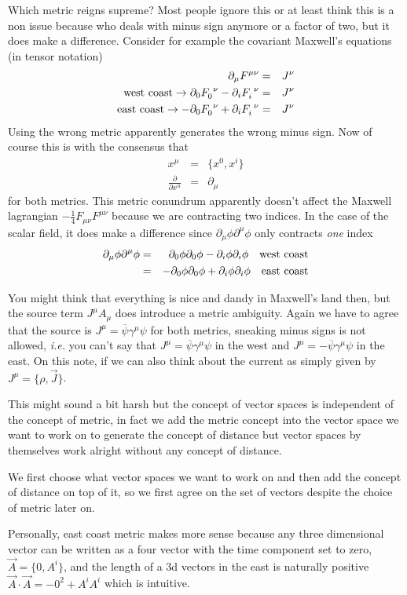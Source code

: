 \documentclass[aps,preprint,preprintnumbers,nofootinbib,showpacs,prd]{revtex4-1}
\newcommand{\ie}{{\it i.e.} }
\newcommand{\nbea}{\begin{eqnarray*}}
\newcommand{\neea}{\end{eqnarray*}}
\begin{document}
Which metric reigns supreme? Most people ignore this or at least think this is a non issue because who deals with minus sign anymore or a factor of two, but it does make a difference. Consider for example the covariant Maxwell's equations (in tensor notation)
%
\nbea
\partial_\mu F^{\mu\nu} & = & J^\nu \\
{\rm west~coast} \to \partial_0 F^{~\nu}_0 - \partial_i F^{~\nu}_i & = & J^\nu \\
{\rm east~coast} \to -\partial_0 F^{~\nu}_0 + \partial_i F^{~\nu}_i & = & J^\nu
\neea
%
Using the wrong metric apparently generates the wrong minus sign. Now of course this is with the consensus that
%
\nbea
x^\mu & = & \{x^0, x^i\} \\
\frac{\partial}{\partial x^u} & = & \partial_\mu
\neea
%
for both metrics. This metric conundrum apparently doesn't affect the Maxwell lagrangian $-\frac{1}{4}F_{\mu\nu}F^{\mu\nu}$ because we are contracting two indices. In the case of the scalar field, it does make a difference since $\partial_\mu\phi\partial^\mu\phi$ only contracts {\it one} index
%
\nbea
\partial_\mu\phi\partial^\mu\phi & = & ~\partial_0\phi\partial_0\phi - \partial_i\phi\partial_i\phi ~~~{\rm west~coast}\\
& = & -\partial_0\phi\partial_0\phi + \partial_i\phi\partial_i\phi ~~~{\rm east~coast}
\neea
%

You might think that everything is nice and dandy in Maxwell's land then, but the source term $J^\mu A_\mu$ does introduce a metric ambiguity. Again we have to agree that the source is $J^\mu = \overline\psi \gamma^\mu \psi$ for both metrics, sneaking minus signs is not allowed, \ie you can't say that $J^\mu = \overline\psi \gamma^\mu \psi$ in the west and $J^\mu = -\overline\psi \gamma^\mu \psi$ in the east. On this note, if we  can also think about the current as simply given by $J^\mu = \{\rho, \vec J\}$.

This might sound a bit harsh but the concept of vector spaces is independent of the concept of metric, in fact we add the metric concept into the vector space we want to work on to generate the concept of distance but vector spaces by themselves work alright without any concept of distance.

We first choose what vector spaces we want to work on and then add the concept of distance on top of it, so we first agree on the set of vectors despite the choice of metric later on.

Personally, east coast metric makes more sense because any three dimensional vector can be written as a four vector with the time component set to zero, $\vec A = \{0, A^i\}$, and the length of a 3d vectors in the east is naturally positive $\vec A \cdot \vec A = -0^2 + A^i A^i$ which is intuitive.
\end{document}
